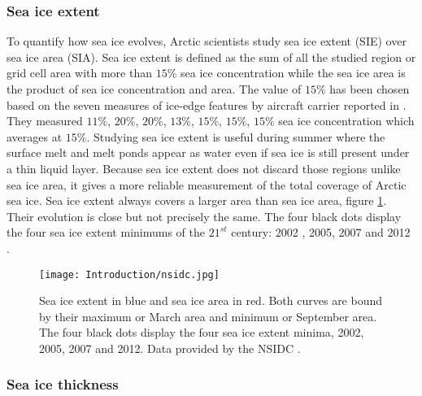 \subsubsection{Sea ice extent}\label{sie}

To quantify how sea ice evolves, Arctic scientists study sea ice extent (SIE) over sea ice area (SIA). Sea ice extent is defined as the sum of all the studied region or grid cell area with more than $15\%$ sea ice concentration while the sea ice area is the product of sea ice concentration and area. The value of $15\%$ has been chosen based on the seven measures of ice-edge features by aircraft carrier reported in \cite{iceedge}. They measured $11\%$, $20\%$, $20\%$, $13\%$, $15\%$, $15\%$, $15\%$ sea ice concentration which averages at $15\%$. Studying sea ice extent is useful during summer where the surface melt and melt ponds appear as water even if sea ice is still present under a thin liquid layer. Because sea ice extent does not discard those regions unlike sea ice area, it gives a more reliable measurement of the total coverage of Arctic sea ice. Sea ice extent always covers a larger area than sea ice area, figure \ref{nsidc}. Their evolution is close but not precisely the same. The four black dots display the four sea ice extent minimums of the $21^{st}$ century: 2002 \citep{2002}, 2005, 2007\citep{EOST:EOST16266} and 2012 \citep{2012}.

\begin{figure}
\center
\texttt{[image: Introduction/nsidc.jpg]}
\caption{Sea ice extent in blue and sea ice area in red. Both curves are bound by their maximum or March area and minimum or September area. The four black dots display the four sea ice extent minima, 2002, 2005, 2007 and 2012. Data provided by the NSIDC \cite{data}.}
\label{nsidc}
\end{figure}


\subsubsection{Sea ice thickness}\label{sit}

